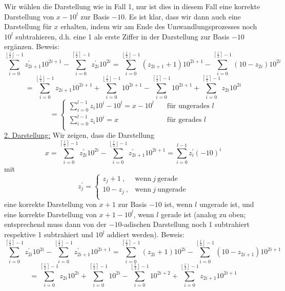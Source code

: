 \documentclass[a4paper, 11pt]{scrartcl}
\theoremstyle{dotless}
\newcommand{\floor}[1]{\left\lfloor #1\right\rfloor}
\newcommand{\ceil}[1]{\left\lceil #1\right\rceil}
\begin{document}
		Wir wählen die Darstellung wie in Fall 1, nur ist dies in diesem Fall eine korrekte Darstellung von $x-10^l$ zur Basis $-10$. Es ist klar, dass wir dann auch eine Darstellung für $x$ erhalten, indem wir am Ende des Umwandlungsprozesses noch $10^l$ subtrahieren, d.h. eine 1 als erste Ziffer in der Darstellung zur Basis $-10$ ergänzen.\newline
		Beweis:\newline
		$$\sum_{i=0}^{\floor{\frac{l}{2}}-1}z_{2i+1}^{\prime} 10^{2i+1}-\sum_{i=0}^{\ceil{\frac{l}{2}}-1}z_{2i}^{\prime} 10^{2i}=\sum_{i=0}^{\floor{\frac{l}{2}}-1}(z_{2i+1}+1) 10^{2i+1}-\sum_{i=0}^{\ceil{\frac{l}{2}}-1}(10-z_{2i})10^{2i}$$
		$$=\sum_{i=0}^{\floor{\frac{l}{2}}-1}z_{2i+1} 10^{2i+1}+\sum_{i=0}^{\floor{\frac{l}{2}}-1} 10^{2i+1}-\sum_{i=0}^{\ceil{\frac{l}{2}}-1} 10^{2i+1}+\sum_{i=0}^{\ceil{\frac{l}{2}}-1}z_{2i} 10^{2i}$$
		$$=\left\{\begin{array}{ll}
		\sum_{i=0}^{l-1}z_i10^i-10^{l}=x-10^{l}\quad&\text{für ungerades }l\\
		\sum_{i=0}^{l-1}z_i10^i=x\quad&\text{für gerades }l\\
		\end{array}\right.
		$$
		\underline{2. Darstellung:}\newline
		Wir zeigen, dass die Darstellung
		$$x=\sum_{i=0}^{\ceil{\frac{l}{2}}-1}z_{2i}^{\prime} 10^{2i}-\sum_{i=0}^{\floor{\frac{l}{2}}-1}z_{2i+1}^{\prime} 10^{2i+1}=\sum_{i=0}^{l-1}z_{i}^{\prime} (-10)^{i}$$
		mit
		$$z_j^{\prime}=\left\{\begin{array}{ll}
		z_j+1~,& \text{wenn}~j~ \text{gerade}\\
		10-z_j~,&\text{wenn}~j~ \text{ungerade}\\
		\end{array}\right.$$
		eine korrekte Darstellung von $x+1$ zur Basis $-10$ ist, wenn $l$ ungerade ist, und eine korrekte Darstellung von $x+1-10^l$, wenn $l$ gerade ist (analog zu oben; entsprechend muss dann von der $-10$-adischen Darstellung noch 1 subtrahiert respektive 1 subtrahiert und $10^l$ addiert werden).\newline
		Beweis:
		$$\sum_{i=0}^{\ceil{\frac{l}{2}}-1}z_{2i}^{\prime} 10^{2i}-\sum_{i=0}^{\floor{\frac{l}{2}}-1}z_{2i+1}^{\prime} 10^{2i+1}=\sum_{i=0}^{\ceil{\frac{l}{2}}-1}(z_{2i}+1) 10^{2i}-\sum_{i=0}^{\floor{\frac{l}{2}}-1}(10-z_{2i+1}) 10^{2i+1}$$
		$$=\sum_{i=0}^{\ceil{\frac{l}{2}}-1}z_{2i} 10^{2i} + \sum_{i=0}^{\ceil{\frac{l}{2}}-1} 10^{2i} - \sum_{i=0}^{\floor{\frac{l}{2}}-1} 10^{2i+2} + \sum_{i=0}^{\floor{\frac{l}{2}}-1}z_{2i+1} 10^{2i+1}$$
\end{document}
